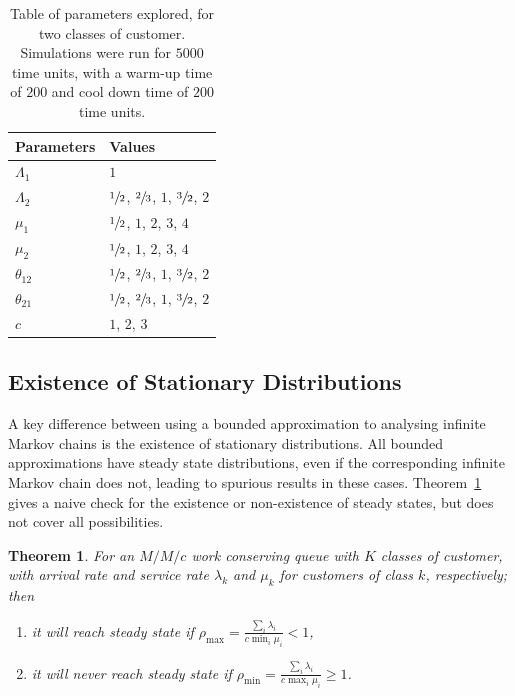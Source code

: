 \documentclass{article}
\newtheorem{theorem}{Theorem}
\begin{document}
\begin{table}
\begin{center}
\begin{tabular}{ll}
\toprule
Parameters & Values \\
\midrule
$\Lambda_1$ & $1$ \\
$\Lambda_2$ & $\sfrac{1}{2}$, $\sfrac{2}{3}$, $1$, $\sfrac{3}{2}$, $2$ \\
$\mu_1$ & $\sfrac{1}{2}$, $1$, $2$, $3$, $4$ \\
$\mu_2$ & $\sfrac{1}{2}$, $1$, $2$, $3$, $4$ \\
$\theta_{12}$ & $\sfrac{1}{2}$, $\sfrac{2}{3}$, $1$, $\sfrac{3}{2}$, $2$ \\
$\theta_{21}$ & $\sfrac{1}{2}$, $\sfrac{2}{3}$, $1$, $\sfrac{3}{2}$, $2$ \\
$c$ & $1$, $2$, $3$ \\
\bottomrule
\end{tabular}
\caption{Table of parameters explored, for two classes of customer. Simulations
         were run for $5000$ time units, with a warm-up time of $200$ and cool
         down time of $200$ time units.}
\label{tbl:parameter_sweep}
\end{center}
\end{table}



\subsection{Existence of Stationary Distributions}\label{sec:stationary}
A key difference between using a bounded approximation to analysing infinite
Markov chains is the existence of stationary distributions. All bounded
approximations have steady state distributions, even if the corresponding
infinite Markov chain does not, leading to spurious results in these cases.
Theorem~\ref{thrm:steadystate} gives a naive check for the existence or
non-existence of steady states, but does not cover all possibilities.

\begin{theorem}\label{thrm:steadystate}
For an $M/M/c$ work conserving queue with $K$ classes of customer, with arrival
rate and service rate $\lambda_k$ and  $\mu_k$ for customers of class $k$,
respectively; then
\begin{enumerate}
  \item it will reach steady state if
  $\rho_{\max} = \frac{\sum_i \lambda_i}{c \min_i \mu_i} < 1$,
  \item it will never reach steady state if
  $\rho_{\min} = \frac{\sum_i \lambda_i}{c \max_i \mu_i} \geq 1$.
\end{enumerate}
\end{theorem}
\end{document}
